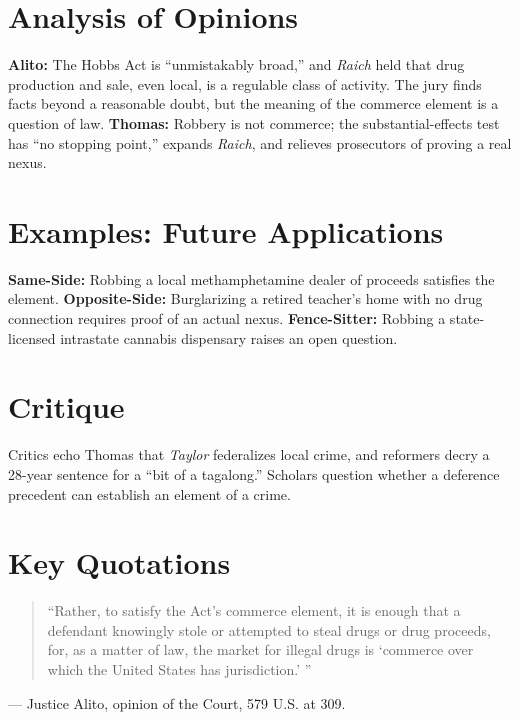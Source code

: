 \documentclass[12pt]{article}
\begin{document}
\section{Analysis of Opinions}
\textbf{Alito:} The Hobbs Act is ``unmistakably broad,'' and \textit{Raich} held that drug production and sale, even local, is a regulable class of activity. The jury finds facts beyond a reasonable doubt, but the meaning of the commerce element is a question of law. \textbf{Thomas:} Robbery is not commerce; the substantial-effects test has ``no stopping point,'' expands \textit{Raich}, and relieves prosecutors of proving a real nexus.

\section{Examples: Future Applications}
\textbf{Same-Side:} Robbing a local methamphetamine dealer of proceeds satisfies the element. \textbf{Opposite-Side:} Burglarizing a retired teacher's home with no drug connection requires proof of an actual nexus. \textbf{Fence-Sitter:} Robbing a state-licensed intrastate cannabis dispensary raises an open question.

\section{Critique}
Critics echo Thomas that \textit{Taylor} federalizes local crime, and reformers decry a 28-year sentence for a ``bit of a tagalong.'' Scholars question whether a deference precedent can establish an element of a crime.

\section{Key Quotations}
\begin{quote}
``Rather, to satisfy the Act's commerce element, it is enough that a defendant knowingly stole or attempted to steal drugs or drug proceeds, for, as a matter of law, the market for illegal drugs is `commerce over which the United States has jurisdiction.' ''
\end{quote}
\noindent --- Justice Alito, opinion of the Court, 579 U.S. at 309.
\end{document}
